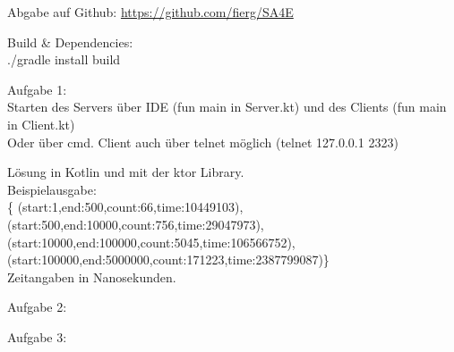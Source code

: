 \documentclass[10pt,a4paper]{article}
\begin{document}
	
\begin{boxedminipage}[t][17cm][t]{\textwidth}
	\par{
	Abgabe auf Github:
	\url{https://github.com/fierg/SA4E}
	
	\medskip
	
	Build \& Dependencies:\\
	./gradle install build\\
}

	\par{

	
	Aufgabe 1:\\
	Starten des Servers über IDE (fun main in Server.kt) und des Clients (fun main in Client.kt)\\
	Oder über cmd.
	Client auch über telnet möglich (telnet 127.0.0.1 2323)
	
	
	Lösung in Kotlin und mit der ktor Library.\\
	Beispielausgabe:\\
	\{ (start:1,end:500,count:66,time:10449103),\\
	(start:500,end:10000,count:756,time:29047973),\\
	(start:10000,end:100000,count:5045,time:106566752),\\
	(start:100000,end:5000000,count:171223,time:2387799087)\}\\
	
	Zeitangaben in Nanosekunden.\\
}


	\par{
		Aufgabe 2:\\
		
		
	}
	
	
	\par{
	Aufgabe 3:\\
	
}
	
\end{boxedminipage}	
\end{document}

